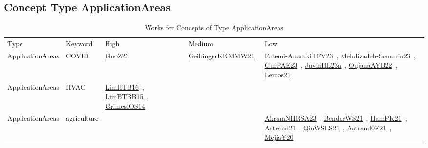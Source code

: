 \clearpage
\subsection{Concept Type ApplicationAreas}
\label{sec:ApplicationAreas}
{\scriptsize
\begin{longtable}{lp{3cm}>{\raggedright\arraybackslash}p{6cm}>{\raggedright\arraybackslash}p{6cm}>{\raggedright\arraybackslash}p{8cm}}
\rowcolor{white}\caption{Works for Concepts of Type ApplicationAreas}\\ \toprule
\rowcolor{white}Type & Keyword & High & Medium & Low\\ \midrule\endhead
\bottomrule
\endfoot
ApplicationAreas & COVID & \href{works/GuoZ23.pdf}{GuoZ23}~\cite{GuoZ23} & \href{works/GeibingerKKMMW21.pdf}{GeibingerKKMMW21}~\cite{GeibingerKKMMW21} & \href{works/Fatemi-AnarakiTFV23.pdf}{Fatemi-AnarakiTFV23}~\cite{Fatemi-AnarakiTFV23}, \href{works/Mehdizadeh-Somarin23.pdf}{Mehdizadeh-Somarin23}~\cite{Mehdizadeh-Somarin23}, \href{works/GurPAE23.pdf}{GurPAE23}~\cite{GurPAE23}, \href{works/JuvinHL23a.pdf}{JuvinHL23a}~\cite{JuvinHL23a}, \href{works/OujanaAYB22.pdf}{OujanaAYB22}~\cite{OujanaAYB22}, \href{works/Lemos21.pdf}{Lemos21}~\cite{Lemos21}\\
ApplicationAreas & HVAC & \href{works/LimHTB16.pdf}{LimHTB16}~\cite{LimHTB16}, \href{works/LimBTBB15.pdf}{LimBTBB15}~\cite{LimBTBB15}, \href{works/GrimesIOS14.pdf}{GrimesIOS14}~\cite{GrimesIOS14} &  & \\
ApplicationAreas & agriculture &  &  & \href{works/AkramNHRSA23.pdf}{AkramNHRSA23}~\cite{AkramNHRSA23}, \href{works/BenderWS21.pdf}{BenderWS21}~\cite{BenderWS21}, \href{works/HamPK21.pdf}{HamPK21}~\cite{HamPK21}, \href{works/Astrand21.pdf}{Astrand21}~\cite{Astrand21}, \href{works/QinWSLS21.pdf}{QinWSLS21}~\cite{QinWSLS21}, \href{works/Astrand0F21.pdf}{Astrand0F21}~\cite{Astrand0F21}, \href{works/MejiaY20.pdf}{MejiaY20}~\cite{MejiaY20}\\

\end{longtable}}
